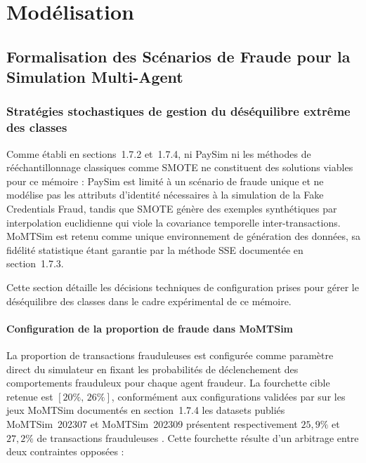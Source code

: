 \documentclass[11pt,a4paper,oneside]{report}
\theoremstyle{definition}
\theoremstyle{remark}
\begin{document}
\part{Modélisation}

\chapter{Formalisation des Scénarios de Fraude pour la Simulation Multi-Agent}


\section{Stratégies stochastiques de gestion du déséquilibre extrême des classes}

Comme établi en sections~1.7.2 et~1.7.4, ni PaySim ni les méthodes de rééchantillonnage classiques comme SMOTE ne constituent des solutions viables pour ce mémoire : PaySim est limité à un scénario de fraude unique et ne modélise pas les attributs d'identité nécessaires à la simulation de la Fake Credentials Fraud, tandis que SMOTE génère des exemples synthétiques par interpolation euclidienne qui viole la covariance temporelle inter-transactions. MoMTSim est retenu comme unique environnement de génération des données, sa fidélité statistique étant garantie par la méthode SSE documentée en section~1.7.3.

Cette section détaille les décisions techniques de configuration prises pour gérer le déséquilibre des classes dans le cadre expérimental de ce mémoire.

\subsection{Configuration de la proportion de fraude dans MoMTSim}

La proportion de transactions frauduleuses est configurée comme paramètre direct du simulateur en fixant les probabilités de déclenchement des comportements frauduleux pour chaque agent fraudeur. La fourchette cible retenue est $[20\%,\, 26\%]$, conformément aux configurations validées par \citet{azamuke2024momtsim, azamuke2025rich} sur les jeux MoMTSim documentés en section~1.7.4  les datasets publiés MoMTSim~202307 et MoMTSim~202309 présentent respectivement $25{,}9\%$ et $27{,}2\%$ de transactions frauduleuses \citep{azamuke2025dataset}. Cette fourchette résulte d'un arbitrage entre deux contraintes opposées :
\end{document}
